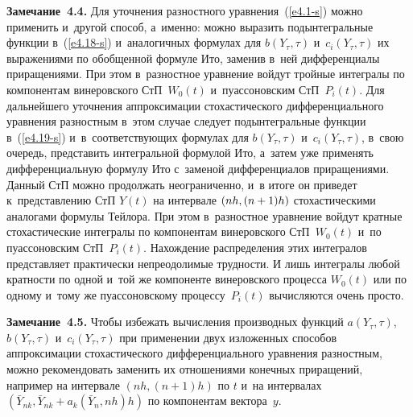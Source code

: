 \begin{multicols}{2}
\noindent
\textbf{Замечание~4.4.}
Для уточнения разностного уравнения~(\ref{e4.1-s}) можно применить и~другой способ, 
а~именно: можно выразить подынтегральные функции в~(\ref{e4.18-s}) и~аналогичных формулах для $b(Y_{\tau},\tau)$ и~$c_i(Y_{\tau},\tau)$ их
выражениями по обобщенной формуле Ито, заменив в~ней дифференциалы
приращениями. При этом в~разностное уравнение войдут тройные интегралы
по компонентам винеровского СтП~$W_0(t)$ и~пуассоновским СтП~$P_i(t)$. Для дальнейшего уточнения аппроксимации стохастического
дифференциального уравнения разностным в~этом случае следует
подынтегральные функции в~(\ref{e4.19-s}) и~в~со\-от\-вет\-ст\-ву\-ющих формулах для
$b(Y_{\tau},\tau)$ и~$c_i(Y_{\tau},\tau)$, в~свою очередь,
представить интегральной формулой Ито, а~затем уже применять
дифференциальную формулу Ито с~заменой дифференциалов приращениями.
Данный СтП можно продолжать неограниченно, и~в итоге он приведет к~представлению СтП $Y(t)$ на интервале $(nh,\linebreak (n\hm+1)h)$
стохастическими аналогами формулы Тейлора. При этом в~разностное
уравнение войдут кратные стохастические интегралы по компонентам
винеровского СтП~$W_0(t)$ и~по пуассоновским СтП~$P_i(t)$.
Нахождение распределения этих интегралов представляет практически
непреодолимые трудности. И лишь интегралы любой кратности по одной и~той же компоненте винеровского процесса $W_0(t)$ или по одному и~тому же
пуассоновскому процессу~$P_i(t)$ вычисляются очень просто.


\smallskip

\noindent
\textbf{Замечание~4.5.}
Чтобы избежать вычисления производных
функций $a(Y_{\tau},\tau)$, $b(Y_{\tau},\tau)$ и~$c_i(Y_{\tau},\tau)$ при
применении двух изложенных способов аппроксимации стохастического
дифференциального уравнения разностным, можно рекомендовать заменить
их отношениями конечных приращений, например на интервале
$(nh,(n+1)h)$ по $t$ и~на интервалах $(\bar Y_{nk}, \bar
Y_{nk}+a_k(\bar Y_n,nh)h)$ по компонентам вектора~$y$.



\smallskip


\end{multicols}
